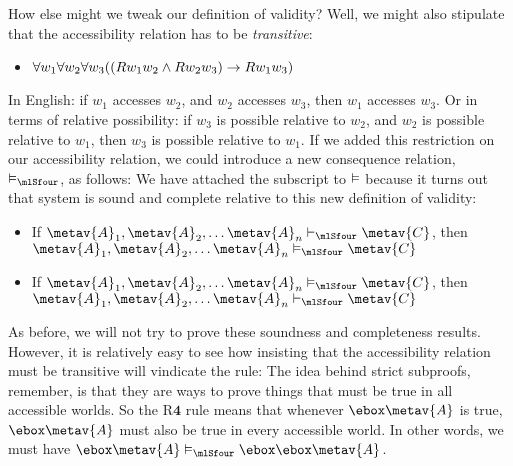 How else might we tweak our definition of validity? Well, we might also stipulate that the accessibility relation has to be \emph{transitive}:
\begin{itemize}
	\item $\forall w_1\forall w_2\forall w_3 ((Rw_1w_2 \wedge Rw_2w_3)\rightarrow Rw_1w_3)$
\end{itemize}
In English: if $w_1$ accesses $w_2$, and $w_2$ accesses $w_3$, then $w_1$ accesses $w_3$. Or in terms of relative possibility: if $w_3$ is possible relative to $w_2$, and $w_2$ is possible relative to $w_1$, then $w_3$ is possible relative to $w_1$. If we added this restriction on our accessibility relation, we could introduce a new consequence relation, $\entails_\mlSfour$, as follows:
We have attached the \mlSfour{} subscript to $\vDash$ because it turns out that system \mlSfour{} is sound and complete relative to this new definition of validity:
\begin{itemize}
	\item If $\metav{A}_1,\metav{A}_2, \dots \metav{A}_n\proves_\mlSfour\metav{C}$, then $\metav{A}_1,\metav{A}_2, \dots \metav{A}_n\entails_\mlSfour\metav{C}$
	\item If $\metav{A}_1,\metav{A}_2, \dots \metav{A}_n\entails_\mlSfour\metav{C}$, then $\metav{A}_1,\metav{A}_2, \dots \metav{A}_n\proves_\mlSfour\metav{C}$
\end{itemize}
As before, we will not try to prove these soundness and completeness results. However, it is relatively easy to see how insisting that the accessibility relation must be transitive will vindicate the \mlSfour{} rule:
The idea behind strict subproofs, remember, is that they are ways to prove things that must be true in all accessible worlds. So the R$\mathbf{4}$ rule means that whenever $\ebox \metav{A}$ is true, $\ebox \metav{A}$ must also be true in every accessible world. In other words, we must have $\ebox\metav{A} \entails_\mlSfour \ebox\ebox\metav{A}$.

